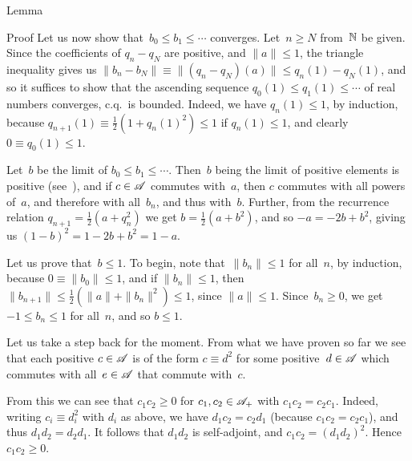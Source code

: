 \documentclass[a]{subfiles}
\begin{document}
\begin{parsec}
\begin{point}{Lemma}
\begin{point}{Proof}
Let us now show that~$b_0\leq b_1\leq \dotsb$ converges.
Let~$n\geq N$ from~$\mathbb{N}$ be given.
Since the coefficients of $q_n-q_N$ are positive,
and $\|a\|\leq 1$,
the triangle inequality gives us
$\|b_n-b_N\|\equiv \|(q_n-q_N)(a)\|\leq q_n(1)-q_N(1)$,
and
so it suffices to 
show that the ascending sequence
 $q_0(1)\leq q_1(1)\leq \dotsb$
of real numbers
converges,
c.q.~is bounded.
Indeed,
we have $q_n(1)\leq 1$,
by induction,
because $q_{n+1}(1)\equiv \frac{1}{2}(1+q_n(1)^2)
\leq 1$ if $q_n(1)\leq 1$,
and clearly $0\equiv q_0(1)\leq 1$.

Let~$b$ be the limit of $b_0\leq b_1\leq\dotsb$.
Then~$b$ being the limit of positive elements
is positive
(see~),
and if $c\in \mathscr{A}$ commutes with~$a$,
then $c$ commutes with all powers of~$a$,
and therefore with all~$b_n$,
and thus with~$b$.
Further, 
from the recurrence relation $q_{n+1} = \frac{1}{2}(a+q_n^2)$
we get $b=\frac{1}{2}(a+b^2)$,
and so $-a = -2b+b^2$, 
giving us  $(1-b)^2 = 1-2b+b^2 = 1-a$.

Let us prove that~$b\leq 1$.
To begin, note that~$\|b_n\|\leq 1$ for all~$n$, by induction,
because $0\equiv \|b_0\|\leq 1$,
and if $\|b_n\|\leq 1$, then $\|b_{n+1}\|\leq \frac{1}{2}(\|a\|+\|b_n\|^2)
\leq 1$, since $\|a\|\leq 1$.
Since~$b_n\geq 0$, we get $-1\leq b_n\leq 1$ for all~$n$,
and so $b\leq 1$.

\begin{point}%
Let us take a step back for the moment.
From what we have proven so far
we see that each positive $c\in\mathscr{A}$
is of the form $c\equiv d^2$ for some positive~$d\in\mathscr{A}$
which commutes with all~$e\in \mathscr{A}$ that commute with~$c$.

From this we can see that $c_1c_2\geq 0$
for  
 $c_1,c_2 \in\mathscr{A}_{+}$
with $c_1c_2 = c_2c_1$.
Indeed, writing $c_i\equiv d_i^2$ with $d_i$ as above,
we have $d_1c_2=c_2d_1$ (because $c_1c_2=c_2c_1$), and thus 
$d_1d_2=d_2d_1$. It follows that $d_1d_2$ is self-adjoint,
and $c_1c_2 = (d_1d_2)^2$. Hence $c_1c_2\geq 0$.


\end{point}
\end{point}
\end{point}
\end{parsec}
\end{document}

